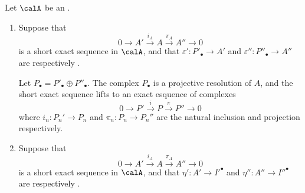 \begin{lemma} \label{lemma:horseshoe_lemma_of_projective_injective_resolutions_in_abelian_categories}
    Let $\calA$ be an . 
    \begin{enumerate}
        \item Suppose that
            $$0 \to A' \xrightarrow{i_A} A \xrightarrow{\pi_A} A'' \to 0$$
            is a short exact sequence in $\calA$, and that $\varepsilon': P'_\bullet \to A'$ and $\varepsilon'': P''_{\bullet} \to A''$ are respectively . 
            \begin{center}
            \end{center}
            Let $P_\bullet = P'_\bullet \oplus P''_\bullet$. The complex $P_\bullet$ is a projective resolution of $A$, and the short exact sequence lifts to an exact esquence of complexes
            $$0 \to P' \xrightarrow{i} P \xrightarrow{\pi} P'' \to 0$$
            where $i_n: P_n' \to P_n$ and $\pi_n: P_n \to P_n''$ are the natural inclusion and projection respectively.
        \item Suppose that
        $$0 \to A' \xrightarrow{i_A} A \xrightarrow{\pi_A} A'' \to 0$$
        is a short exact sequence in $\calA$, and that $\eta': A' \to I'^\bullet$ and $\eta'': A'' \to I''^\bullet$ are respectively . 


\end{enumerate}
\end{lemma}
